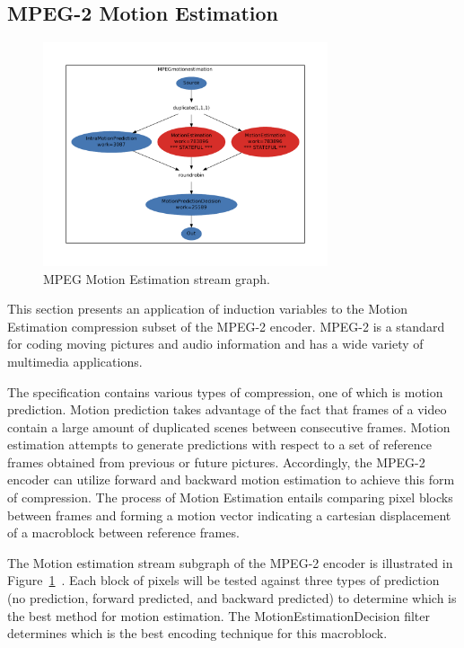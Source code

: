 \subsection{MPEG-2 Motion Estimation}
\label{sec:mpeg}

\begin{figure}[t]
\includegraphics[width=3.3in]{figures/work_estimate_mpeg_motionestimation.pdf}
\caption{MPEG Motion Estimation stream graph.\protect\label{fig:mpegMEgraph}}
\end{figure}


This section presents an application of induction variables to the Motion Estimation compression subset of the MPEG-2 encoder.  MPEG-2 is a standard for coding moving pictures and audio information and has a wide variety of multimedia applications.  

The specification contains various types of compression, one of which is motion prediction.  Motion prediction takes advantage of the fact that frames of a video contain a large amount of duplicated scenes between consecutive frames.  Motion estimation attempts to generate predictions with respect to a set of reference frames obtained from previous or future pictures.  Accordingly, the MPEG-2 encoder can utilize forward and backward motion estimation to achieve this form of compression.  The process of Motion Estimation entails comparing pixel blocks between frames and forming a motion vector indicating a cartesian displacement of a macroblock between reference frames.  

The Motion estimation stream subgraph of the MPEG-2 encoder is illustrated in Figure~\ref{fig:mpegMEgraph}~\cite{drake-thesis}.  Each block of pixels will be tested against three types of prediction (no prediction, forward predicted, and backward predicted) to determine which is the best method for motion estimation.  The MotionEstimationDecision filter determines which is the best encoding technique for this macroblock.

